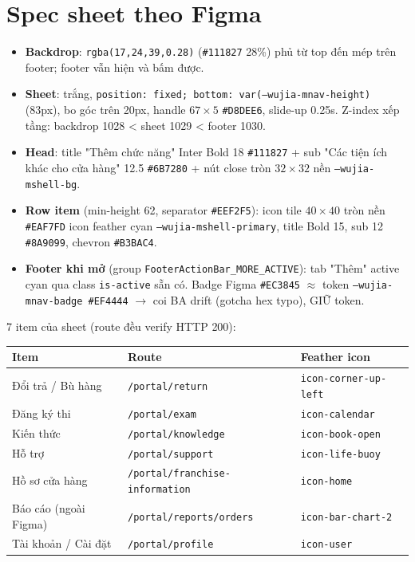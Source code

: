 \section{Spec sheet theo Figma}

\begin{itemize}
  \item \textbf{Backdrop}: \texttt{rgba(17,24,39,0.28)} (\texttt{\#111827} 28\%) phủ
        từ top đến mép trên footer; footer vẫn hiện và bấm được.
  \item \textbf{Sheet}: trắng, \texttt{position: fixed; bottom: var(--wujia-mnav-height)}
        (83px), bo góc trên 20px, handle \(67\times5\) \texttt{\#D8DEE6}, slide-up
        0.25s. Z-index xếp tầng: backdrop 1028 < sheet 1029 < footer 1030.
  \item \textbf{Head}: title "Thêm chức năng" Inter Bold 18 \texttt{\#111827} + sub
        "Các tiện ích khác cho cửa hàng" 12.5 \texttt{\#6B7280} + nút close tròn
        \(32\times32\) nền \texttt{--wujia-mshell-bg}.
  \item \textbf{Row item} (min-height 62, separator \texttt{\#EEF2F5}): icon tile
        \(40\times40\) tròn nền \texttt{\#EAF7FD} icon feather cyan
        \texttt{--wujia-mshell-primary}, title Bold 15, sub 12 \texttt{\#8A9099},
        chevron \texttt{\#B3BAC4}.
  \item \textbf{Footer khi mở} (group \texttt{FooterActionBar\_MORE\_ACTIVE}): tab
        "Thêm" active cyan qua class \texttt{is-active} sẵn có. Badge Figma
        \texttt{\#EC3845} \(\approx\) token \texttt{--wujia-mnav-badge \#EF4444}
        \(\rightarrow\) coi BA drift (gotcha hex typo), GIỮ token.
\end{itemize}

7 item của sheet (route đều verify HTTP 200):

\begin{longtable}{@{}lp{5.2cm}l@{}}
\toprule
\textbf{Item} & \textbf{Route} & \textbf{Feather icon} \\
\midrule
\endhead
Đổi trả / Bù hàng & \texttt{/portal/return} & \texttt{icon-corner-up-left} \\
Đăng ký thi & \texttt{/portal/exam} & \texttt{icon-calendar} \\
Kiến thức & \texttt{/portal/knowledge} & \texttt{icon-book-open} \\
Hỗ trợ & \texttt{/portal/support} & \texttt{icon-life-buoy} \\
Hồ sơ cửa hàng & \texttt{/portal/franchise-information} & \texttt{icon-home} \\
Báo cáo (ngoài Figma) & \texttt{/portal/reports/orders} & \texttt{icon-bar-chart-2} \\
Tài khoản / Cài đặt & \texttt{/portal/profile} & \texttt{icon-user} \\
\bottomrule
\end{longtable}

